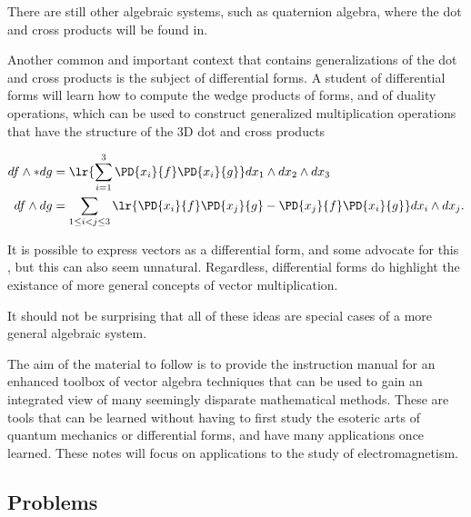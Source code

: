 There are still other algebraic systems, such as quaternion algebra, where the dot and cross products will be found in.  

Another common and important context that contains generalizations of the dot and cross products is the subject of differential forms.
A student of differential forms will learn how to compute the wedge products of forms, and of duality operations, which can be used to construct generalized multiplication operations that have the structure of the 3D dot and cross products

\begin{equation}\label{eqn:GAmotivation:160}
\begin{aligned}
df \wedge * dg &= \lr{ \sum_{i=1}^3 \PD{x_i}{f} \PD{x_i}{g} } dx_1 \wedge dx_2 \wedge dx_3 \\
df \wedge dg &= \sum_{1 \le i < j \le 3} \lr{
\PD{x_i}{f} \PD{x_j}{g} 
-\PD{x_j}{f} \PD{x_i}{g} 
}
dx_i \wedge dx_j.
\end{aligned}
\end{equation}

It is possible to express vectors as a differential form, and some advocate for this \citep{flanders1989dfa}, but this can also seem unnatural.  Regardless, differential forms do highlight the existance of more general concepts of vector multiplication.  %

It should not be surprising that all of these ideas are special cases of a more general algebraic system.

The aim of the material to follow is to provide the instruction manual for an enhanced toolbox of vector algebra techniques that can be used to gain an integrated view of many seemingly disparate mathematical methods.  These are tools that can be learned without having to first study the esoteric arts of quantum mechanics or differential forms, and have many applications once learned.  These notes will focus on applications to the study of electromagnetism.

\subsection{Problems}



